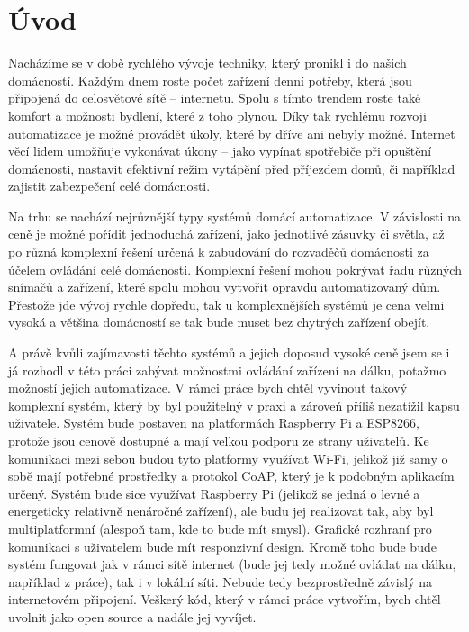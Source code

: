 \chapter{Úvod}
Nacházíme se v době rychlého vývoje techniky, který pronikl i do našich domácností. Každým dnem roste počet zařízení denní potřeby, která jsou připojená do celosvětové sítě -- internetu. Spolu s tímto trendem roste také komfort a možnosti bydlení, které z toho plynou. Díky tak rychlému rozvoji automatizace je možné provádět úkoly, které by dříve ani nebyly možné. Internet věcí lidem umožňuje vykonávat úkony -- jako vypínat spotřebiče při opuštění domácnosti, nastavit efektivní režim vytápění před příjezdem domů, či například zajistit zabezpečení celé domácnosti. 

Na trhu se nachází nejrůznější typy systémů domácí automatizace. V závislosti na ceně je možné pořídit jednoduchá zařízení, jako jednotlivé zásuvky či světla, až po různá komplexní řešení určená k zabudování do rozvaděčů domácnosti za účelem ovládání celé domácnosti. Komplexní řešení mohou pokrývat řadu různých snímačů a zařízení, které spolu mohou vytvořit opravdu automatizovaný dům. Přestože jde vývoj rychle dopředu, tak u komplexnějších systémů je cena velmi vysoká a většina domácností se tak bude muset bez chytrých zařízení obejít. 

A právě kvůli zajímavosti těchto systémů a jejich doposud vysoké ceně jsem se i já rozhodl v této práci zabývat možnostmi ovládání zařízení na dálku, potažmo možností jejich automatizace. V rámci práce bych chtěl vyvinout takový komplexní systém, který by byl použitelný v praxi a zároveň příliš nezatížil kapsu uživatele. Systém bude postaven na platformách Raspberry Pi a ESP8266, protože jsou cenově dostupné a mají velkou podporu ze strany uživatelů. Ke komunikaci mezi sebou budou tyto platformy využívat Wi-Fi, jelikož již samy o sobě mají potřebné prostředky a protokol CoAP, který je k podobným aplikacím určený. Systém bude sice využívat Raspberry Pi (jelikož se jedná o levné a energeticky relativně nenáročné zařízení), ale budu jej realizovat tak, aby byl multiplatformní (alespoň tam, kde to bude mít smysl). Grafické rozhraní pro komunikaci s uživatelem bude mít responzivní design. Kromě toho bude bude systém fungovat jak v rámci sítě internet (bude jej tedy možné ovládat na dálku, například z práce), tak i v lokální síti. Nebude tedy bezprostředně závislý na internetovém připojení. Veškerý kód, který v rámci práce vytvořím, bych chtěl uvolnit jako open source a nadále jej vyvíjet.



